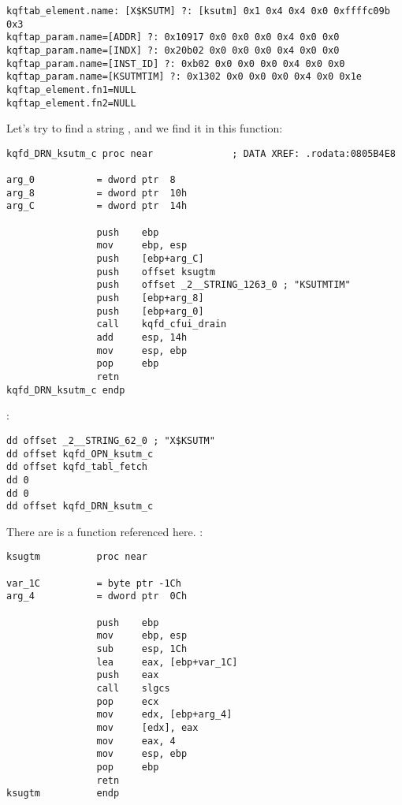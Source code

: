 \begin{lstlisting}[caption=\IFRU{Результат работы}{Result of} \OracleTablesName]
kqftab_element.name: [X$KSUTM] ?: [ksutm] 0x1 0x4 0x4 0x0 0xffffc09b 0x3
kqftap_param.name=[ADDR] ?: 0x10917 0x0 0x0 0x0 0x4 0x0 0x0
kqftap_param.name=[INDX] ?: 0x20b02 0x0 0x0 0x0 0x4 0x0 0x0
kqftap_param.name=[INST_ID] ?: 0xb02 0x0 0x0 0x0 0x4 0x0 0x0
kqftap_param.name=[KSUTMTIM] ?: 0x1302 0x0 0x0 0x0 0x4 0x0 0x1e
kqftap_element.fn1=NULL
kqftap_element.fn2=NULL
\end{lstlisting}

{Let's try to find a string , and we find it in this function:}

\begin{lstlisting}
kqfd_DRN_ksutm_c proc near              ; DATA XREF: .rodata:0805B4E8

arg_0           = dword ptr  8
arg_8           = dword ptr  10h
arg_C           = dword ptr  14h

                push    ebp
                mov     ebp, esp
                push    [ebp+arg_C]
                push    offset ksugtm
                push    offset _2__STRING_1263_0 ; "KSUTMTIM"
                push    [ebp+arg_8]
                push    [ebp+arg_0]
                call    kqfd_cfui_drain
                add     esp, 14h
                mov     esp, ebp
                pop     ebp
                retn
kqfd_DRN_ksutm_c endp
\end{lstlisting}

   
 :

\begin{lstlisting}
dd offset _2__STRING_62_0 ; "X$KSUTM"
dd offset kqfd_OPN_ksutm_c
dd offset kqfd_tabl_fetch
dd 0
dd 0
dd offset kqfd_DRN_ksutm_c
\end{lstlisting}

{There are is a function  referenced here}.
:

\begin{lstlisting}[caption=ksu.o]
ksugtm          proc near

var_1C          = byte ptr -1Ch
arg_4           = dword ptr  0Ch

                push    ebp
                mov     ebp, esp
                sub     esp, 1Ch
                lea     eax, [ebp+var_1C]
                push    eax
                call    slgcs
                pop     ecx
                mov     edx, [ebp+arg_4]
                mov     [edx], eax
                mov     eax, 4
                mov     esp, ebp
                pop     ebp
                retn
ksugtm          endp
\end{lstlisting}

